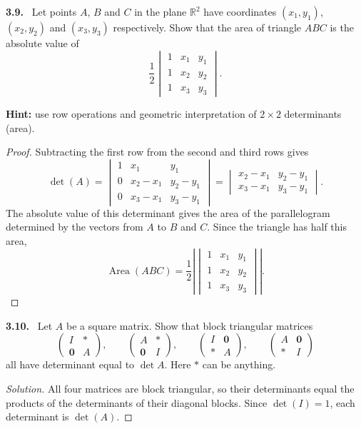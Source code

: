 \documentclass[12pt]{amsart}
\newcommand{\R}{\mathbb{R}}
\newcommand{\pmat}[1]{\begin{pmatrix}#1\end{pmatrix}}
\theoremstyle{plain}
\theoremstyle{definition}
\theoremstyle{remark}
\newenvironment{problem}[1]{\par\medskip\noindent\textbf{#1.}\ }{\par\smallskip}
\newenvironment{solution}{\begin{proof}[Solution]}{\end{proof}}
\begin{document}
\begin{problem}{3.9}
Let points $A$, $B$ and $C$ in the plane $\R^2$ have coordinates $(x_1, y_1)$, $(x_2, y_2)$ and $(x_3, y_3)$ respectively. Show that the area of triangle $ABC$ is the absolute value of
\[
  \frac{1}{2}
  \begin{vmatrix} 1 & x_1 & y_1 \\ 1 & x_2 & y_2 \\ 1 & x_3 & y_3 \end{vmatrix}.
\]

\noindent\textbf{Hint:} use row operations and geometric interpretation of $2\times 2$ determinants (area).
\end{problem}

\begin{proof}
Subtracting the first row from the second and third rows gives
\[
\det(A)=
\begin{vmatrix}
1&x_1&y_1\\
0&x_2-x_1&y_2-y_1\\
0&x_3-x_1&y_3-y_1
\end{vmatrix}
=
\begin{vmatrix}
x_2-x_1&y_2-y_1\\
x_3-x_1&y_3-y_1
\end{vmatrix}.
\]
The absolute value of this determinant gives the area of the parallelogram determined by the vectors from $A$ to $B$ and $C$. Since the triangle has half this area,
\[
\operatorname{Area}(ABC)=\frac12\left|
\begin{vmatrix}
1&x_1&y_1\\
1&x_2&y_2\\
1&x_3&y_3
\end{vmatrix}
\right|.
\]
\end{proof}

\begin{problem}{3.10}
Let $A$ be a square matrix. Show that block triangular matrices
\[
  \pmat{I & * \\ \bm{0} & A}, \qquad
  \pmat{A & * \\ \bm{0} & I}, \qquad
  \pmat{I & \bm{0} \\ * & A}, \qquad
  \pmat{A & \bm{0} \\ * & I}
\]
all have determinant equal to $\det A$. Here $*$ can be anything.
\end{problem}

\begin{solution}
    All four matrices are block triangular, so their determinants equal the products of the determinants of their diagonal blocks. Since $\det(I)=1$, each determinant is $\det(A)$.
\end{solution}
\end{document}

